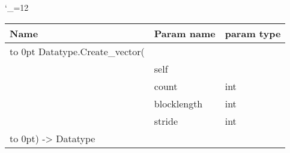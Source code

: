 \begingroup \catcode`\_=12 \tt
\begin{tabular}{lll}
\toprule
\textrm{Name}&\textrm{Param name}&\textrm{param type}\\
\midrule
\hbox to 0pt {Datatype.Create_vector(\hss}\\
& self\\
& count & int\\
& blocklength & int\\
& stride & int\\
\hbox to 0pt{) -> Datatype\hss}\\
\bottomrule
\end{tabular}
\endgroup
